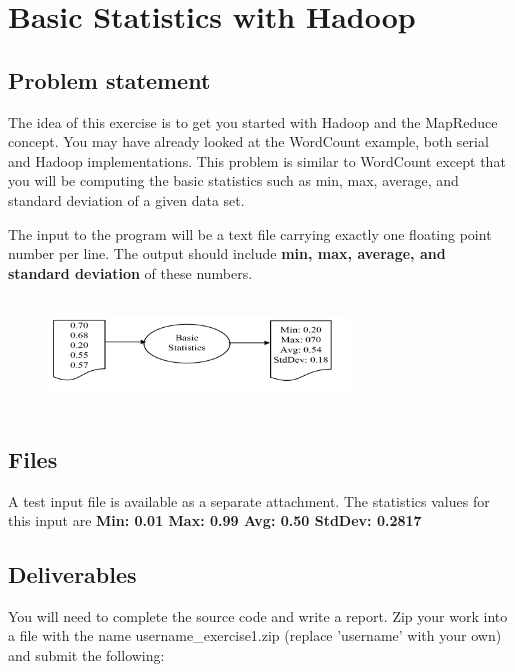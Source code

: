\section*{Basic Statistics with Hadoop}       

\subsection*{Problem statement}
 
The idea of this exercise is to get you started with Hadoop and the MapReduce
concept. You may have already looked at the WordCount example, both serial and
Hadoop implementations. This problem is similar to WordCount except that you
will be computing the basic statistics such as min, max, average, and standard
deviation of a given data set.

The input to the program will be a text file carrying exactly one floating
point number per line. The output should include \textbf{min, max, average, and
standard deviation} of these numbers.

\begin{figure}[!htbp]
\includegraphics[width=8cm,height=3cm]{section/icloud/assignment/problems/project1/p1example.png}
\centering
\end{figure}

\subsection*{Files}
A test input file is available as a separate attachment.
The statistics values for this input are \textbf{Min: 0.01 Max: 0.99 Avg: 0.50 StdDev: 0.2817}


\subsection*{Deliverables}

You will need to complete the source code and write a report. Zip your work
into a file with the name username\_exercise1.zip (replace 'username' with your
own) and submit the following:

